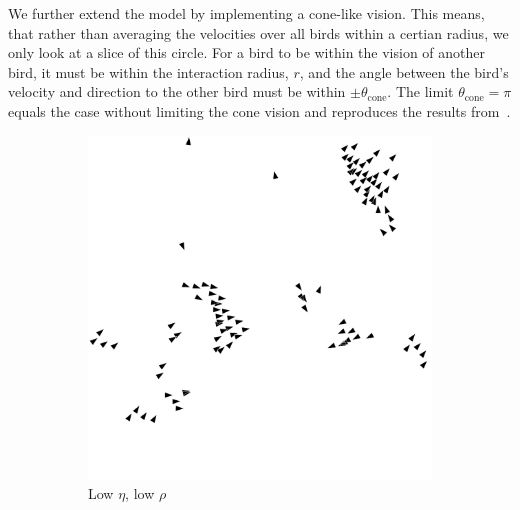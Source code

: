 \documentclass[twoside,twocolumn]{article}
\begin{document}
We further extend the model by implementing a cone-like vision. This means, that 
rather than averaging the velocities over all birds within a certian radius, we 
only look at a slice of this circle. For a bird to be within the vision of 
another bird, it must be within the interaction radius, $r$, and the angle 
between the bird's velocity and direction to the other bird must be within $\pm \theta_{\text{cone}}$. The 
limit $\theta_{\text{cone}} = \pi$ equals the case without limiting the
cone vision and reproduces the results from~\cite{Vicsek}.

\begin{figure}[!htb]
	\centering
        \begin{subfigure}[b]{0.45\columnwidth}
	    \includegraphics[width=\columnwidth]{low-eta-low-rho}
            \caption{Low $\eta$, low $\rho$}
        \end{subfigure}
        \begin{subfigure}[b]{0.45\columnwidth}

\end{subfigure}
\end{figure}
\end{document}

